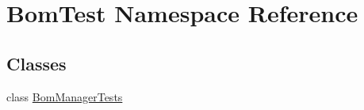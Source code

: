 \hypertarget{namespace_bom_test}{}\section{Bom\+Test Namespace Reference}
\label{namespace_bom_test}
\subsection*{Classes}
\begin{DoxyCompactItemize}
\item 
class \mbox{\hyperlink{class_bom_test_1_1_bom_manager_tests}{Bom\+Manager\+Tests}}
\end{DoxyCompactItemize}
